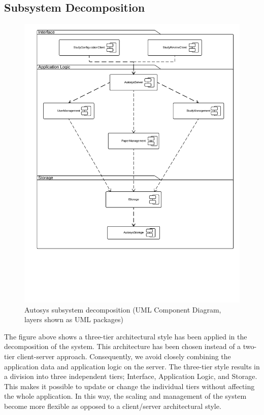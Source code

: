 \subsection{Subsystem Decomposition}
\begin{figure}[H]
	\includegraphics[width = \linewidth]{UMLComponentDiagramSubsystems}
	\caption{Autosys subsystem decomposition (UML Component Diagram, layers shown as UML packages)}
	\label{fig:Subsystem Decomposition, UML Component Diagram}
\end{figure}
The figure above shows a three-tier architectural style has been applied in the decomposition of the system. This architecture has been chosen instead of a two-tier client-server approach. Consequently, we avoid closely combining the application data and application logic on the server. The three-tier style results in a division into three independent tiers; Interface, Application Logic, and Storage. This makes it possible to update or change the individual tiers without affecting the whole application. In this way, the scaling and management of the system become more flexible as opposed to a client/server architectural style.
